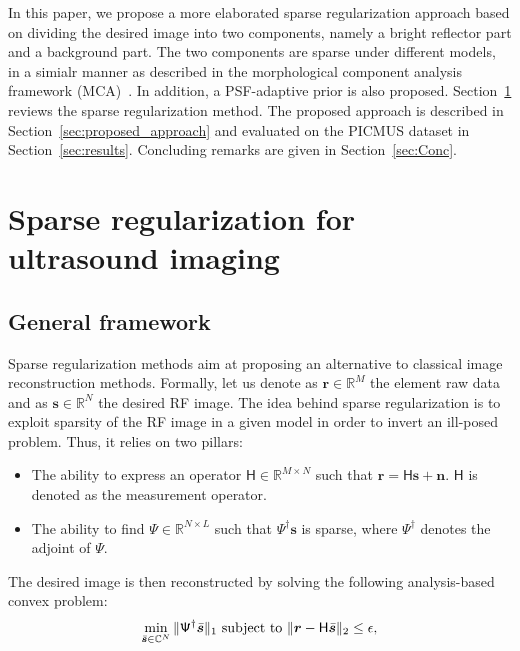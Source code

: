 \documentclass[conference]{IEEEtran}
\begin{document}
\par In this paper, we propose a more elaborated sparse regularization approach based on dividing the desired image into two components, namely a bright reflector part and a background part. The two components are sparse under different models, in a simialr manner as described in the morphological component analysis framework (MCA)~\cite{Starck2004}. In addition, a PSF-adaptive prior is also proposed. Section~\ref{sec:sparse_regularization} reviews the sparse regularization method. The proposed approach is described in Section~\ref{sec:proposed_approach} and evaluated on the PICMUS dataset in Section~\ref{sec:results}. Concluding remarks are given in Section~\ref{sec:Conc}.
\section{Sparse regularization for ultrasound imaging}
\label{sec:sparse_regularization}
\subsection{General framework}
\label{subsec:general_framework}
Sparse regularization methods aim at proposing an alternative to classical image reconstruction methods. Formally, let us denote as $\bm{r} \in \mathbb{R}^M$ the element raw data and as $\bm{s} \in \mathbb{R}^N$ the desired RF image.
The idea behind sparse regularization is to exploit sparsity of the RF image in a given model in order to invert an ill-posed problem. Thus, it relies on two pillars:
\begin{itemize}
	\item The ability to express an operator $\mathsf{H} \in \mathbb{R}^{M \times N}$ such that $\bm{r} = \mathsf{H} \bm{s} + \bm{n}$. $\mathsf{H}$ is denoted as the measurement operator.
	\item The ability to find $\mathsf{\Psi} \in \mathbb{R}^{N \times L}$ such that $\mathsf{\Psi}^\dagger \bm{s}$ is sparse, where $\mathsf{\Psi}^\dagger$ denotes the adjoint of $\mathsf{\Psi}$.
\end{itemize}
The desired image is then reconstructed by solving the following analysis-based convex problem:
\begin{equation}\label{cs6}
\min_{\bar{\bm{s}}\in\mathbb{C}^{N}}\|\mathsf{\Psi}^{\dagger}\bar{\bm{s}}\|_{1}
\textnormal{ subject to }\| \bm{r}-\mathsf{H}\bar{\bm{s}}\|_{2}\leq\epsilon,
\end{equation}
\end{document}

